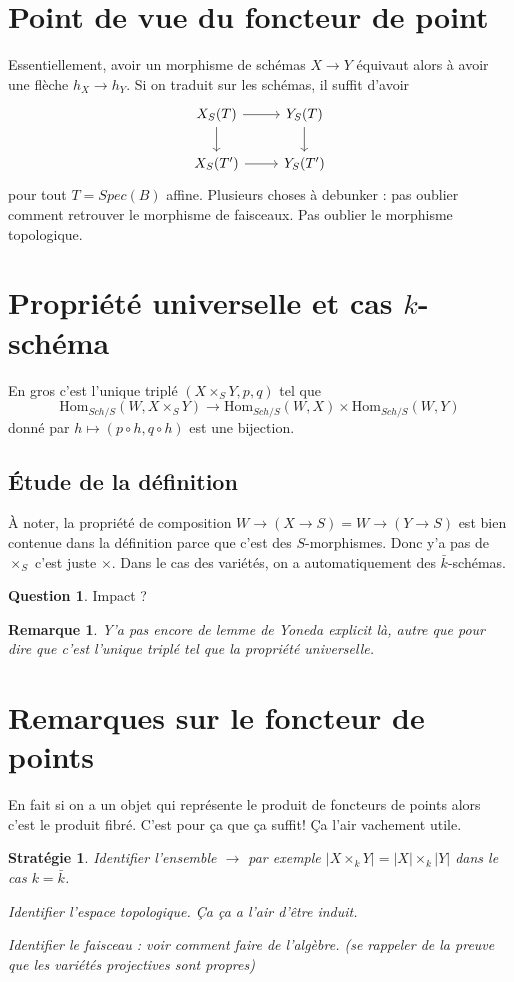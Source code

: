 \documentclass[a4paper,12pt]{book}
\newcommand{\Hom}{\textrm{Hom}}
\theoremstyle{plain}
\newtheorem{rem}{Remarque}
\newtheorem{strat}{Stratégie}
\theoremstyle{definition}
\newtheorem{quest}{Question}
\theoremstyle{remark}
\begin{document}
\section{Point de vue du foncteur de point}
Essentiellement, avoir un morphisme de schémas
$X\to Y$ équivaut alors à avoir une flèche 
$h_X\to h_Y$. Si on traduit sur les schémas, il 
suffit d'avoir 
\[\begin{tikzcd}
	{X_S(T)} & {Y_S(T)} \\
	{X_S(T')} & {Y_S(T')}
	\arrow[from=1-1, to=1-2]
	\arrow[from=1-1, to=2-1]
	\arrow[from=1-2, to=2-2]
	\arrow[from=2-1, to=2-2]
\end{tikzcd}\]
pour tout $T=Spec(B)$ affine. Plusieurs
choses à debunker : pas oublier comment retrouver le morphisme
de faisceaux. Pas oublier le morphisme topologique.


\section{Propriété universelle et cas $k$-schéma}
En gros c'est l'unique triplé $(X\times_S Y, p,q)$
tel que \[\Hom_{Sch/S}(W, X\times_S Y)\to \Hom_{Sch/S}(W,X)\times \Hom_{Sch/S}(W,Y)\]
donné par $h\mapsto (p\circ h,q\circ h)$ est une bijection.
\subsection{Étude de la définition}
À noter, la propriété de composition $W\to (X\to S)=W\to (Y\to S)$
est bien contenue dans la définition parce que c'est des 
$S$-morphismes. Donc y'a pas de $\times_S$ c'est juste $\times$.
Dans le cas des variétés, on a automatiquement des 
$\bar k$-schémas.
\begin{quest}
  Impact ?
\end{quest}

\begin{rem}
  Y'a pas encore de lemme de Yoneda explicit là, autre que pour
  dire que c'est l'unique triplé tel que la propriété universelle.
\end{rem}


\section{Remarques sur le foncteur de points}
En fait si on a un objet qui représente le produit de foncteurs
de points alors c'est le produit fibré. C'est pour ça que ça 
suffit! Ça l'air vachement utile. 
\begin{strat}
  \item Identifier l'ensemble $\to$ par exemple
    $|X\times_k Y|=|X|\times_k|Y|$ dans le cas $k=\bar k$.
  \item Identifier l'espace topologique. Ça ça a l'air d'être
    induit.
  \item Identifier le faisceau : voir comment faire de l'algèbre.
    (se rappeler de la preuve que les variétés projectives sont
    propres)
\end{strat}
\end{document}
